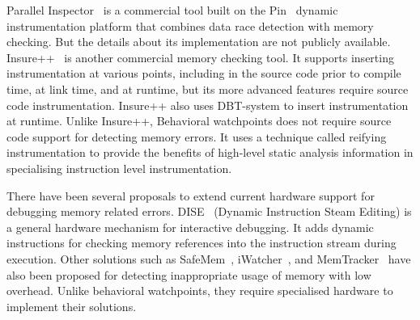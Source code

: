 Parallel Inspector~\cite{reference/parallel/Petersen11a} is a commercial tool built on the Pin~\cite{PinOS} dynamic instrumentation platform that combines data race detection with memory checking. But the details about its implementation are not publicly available. Insure++~\cite{Parasoft00INSU} is another commercial memory checking tool. It supports inserting instrumentation at various points, including in the source code prior to compile time, at link time, and at runtime, but its more advanced features require source code instrumentation. Insure++ also uses DBT-system to insert instrumentation at runtime. Unlike Insure++, Behavioral watchpoints does not require source code support for detecting memory errors. It uses a technique called reifying instrumentation to provide the benefits of high-level static analysis information in specialising instruction level instrumentation.

There have been several proposals to extend current hardware support for debugging memory related errors. DISE~\cite{Corliss:2005:LID:1042442.1043429} (Dynamic Instruction Steam Editing) is a general hardware mechanism for interactive debugging. It adds dynamic instructions for checking memory references into the instruction stream during execution. Other solutions such as SafeMem~\cite{Qin:2005:SEE:1042442.1043428}, iWatcher~\cite{Zhou:2004:IEA:998680.1006720}, and MemTracker~\cite{Venkataramani:2007:MEP:1317533.1318083} have also been proposed for detecting inappropriate usage of memory with low overhead. Unlike behavioral watchpoints, they require specialised hardware to implement their solutions. 









